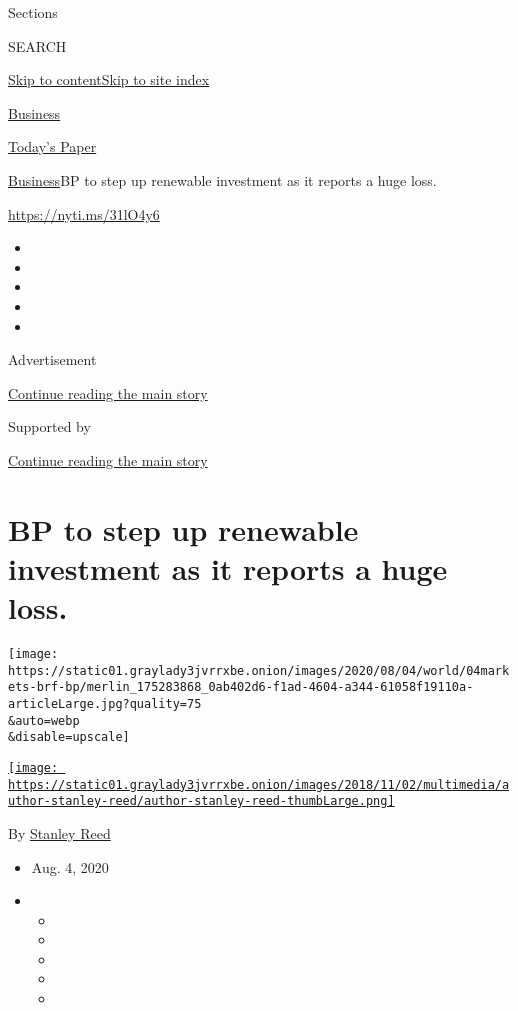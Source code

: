 Sections

SEARCH

\protect\hyperlink{site-content}{Skip to
content}\protect\hyperlink{site-index}{Skip to site index}

\href{https://www.nytimes3xbfgragh.onion/section/business}{Business}

\href{https://myaccount.nytimes3xbfgragh.onion/auth/login?response_type=cookie\&client_id=vi}{}

\href{https://www.nytimes3xbfgragh.onion/section/todayspaper}{Today's
Paper}

\href{/section/business}{Business}\textbar{}BP to step up renewable
investment as it reports a huge loss.

\url{https://nyti.ms/31lO4y6}

\begin{itemize}
\item
\item
\item
\item
\item
\end{itemize}

Advertisement

\protect\hyperlink{after-top}{Continue reading the main story}

Supported by

\protect\hyperlink{after-sponsor}{Continue reading the main story}

\hypertarget{bp-to-step-up-renewable-investment-as-it-reports-a-huge-loss}{%
\section{BP to step up renewable investment as it reports a huge
loss.}\label{bp-to-step-up-renewable-investment-as-it-reports-a-huge-loss}}

\texttt{[image: https://static01.graylady3jvrrxbe.onion/images/2020/08/04/world/04markets-brf-bp/merlin\_175283868\_0ab402d6-f1ad-4604-a344-61058f19110a-articleLarge.jpg?quality=75\\\&auto=webp\\\&disable=upscale]}

\href{https://www.nytimes3xbfgragh.onion/by/stanley-reed}{\texttt{[image: https://static01.graylady3jvrrxbe.onion/images/2018/11/02/multimedia/author-stanley-reed/author-stanley-reed-thumbLarge.png]}}

By \href{https://www.nytimes3xbfgragh.onion/by/stanley-reed}{Stanley
Reed}

\begin{itemize}
\item
  Aug. 4, 2020
\item
  \begin{itemize}
  \item
  \item
  \item
  \item
  \item
  \end{itemize}
\end{itemize}

